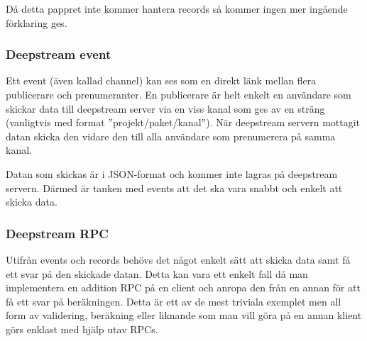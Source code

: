 Då detta pappret inte kommer hantera records så kommer ingen mer ingående förklaring ges\cite{ds-storingdata}.

\subsubsection{Deepstream event}
Ett event (även kallad channel) kan ses som en direkt länk mellan flera publicerare och prenumeranter. En publicerare är helt enkelt en användare som skickar data till deepstream server via en viss kanal som ges av en sträng (vanligtvis med format ''projekt/paket/kanal''). När deepstream servern mottagit datan skicka den vidare den till alla användare som prenumerera på samma kanal. 

Datan som skickas är i JSON-format och kommer inte lagras på deepstream servern. Därmed är tanken med events att det ska vara snabbt och enkelt att skicka data. 

\subsubsection{Deepstream RPC}
Utifrån events och records behövs det något enkelt sätt att skicka data samt få ett svar på den skickade datan. Detta kan vara ett enkelt fall då man implementera en addition RPC på en client och anropa den från en annan för att få ett svar på beräkningen. Detta är ett av de mest triviala exemplet men all form av validering, beräkning eller liknande som man vill göra på en annan klient görs enklast med hjälp utav RPCs.
